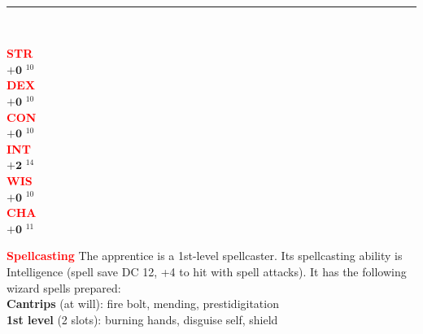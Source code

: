 \documentclass{article}
\begin{document}
\begin{adjustbox}{minipage=0.45\textwidth, margin=\fboxsep, bgimage=../images/texture2.pdf}
{\begin{minipage}[t][10.5in][t]{0.9\textwidth}
\begin{minipage}[t]{0.7\textwidth}
 
        \end{minipage}
        \vspace{0.025in}\\
        \rule{\textwidth}{1pt}\\
        \vspace{0.025in}
        \begin{minipage}[t]{0.2\textwidth}
            {\large
            \textcolor{red}{\textbf{STR}}\\[0.1em]
            $\mathbf{+0}$\,\,$^{10}$ \\[0.1em]
            \textcolor{red}{\textbf{DEX}}\\[0.1em]
            $\mathbf{+0}$\,\,$^{10}$ \\[0.1em]
            \textcolor{red}{\textbf{CON}}\\[0.1em]
            $\mathbf{+0}$\,\,$^{10}$ \\[0.1em]
            \textcolor{red}{\textbf{INT}}\\[0.1em]
            $\mathbf{+2}$\,\,$^{14}$ \\[0.1em]
            \textcolor{red}{\textbf{WIS}}\\[0.1em]
            $\mathbf{+0}$\,\,$^{10}$ \\[0.1em]
            \textcolor{red}{\textbf{CHA}}\\[0.1em]
            $\mathbf{+0}$\,\,$^{11}$ \\[0.1em]
            }
        \end{minipage}
        \hspace{-0.1in}
        \vline
        \hspace{0.1in}
        \begin{minipage}[t]{0.7\textwidth}
            \textcolor{red}{\textbf{Spellcasting}} The apprentice is a 1st-level spellcaster. Its spellcasting ability is Intelligence (spell save DC 12, +4 to hit with spell attacks). It has the following wizard spells prepared:\\ \textbf{Cantrips} (at will): fire bolt, mending, prestidigitation \\\textbf{1st level} (2 slots): burning hands, disguise self, shield \\[0.2em]


\end{minipage}
\end{minipage}}
\end{adjustbox}
\end{document}
